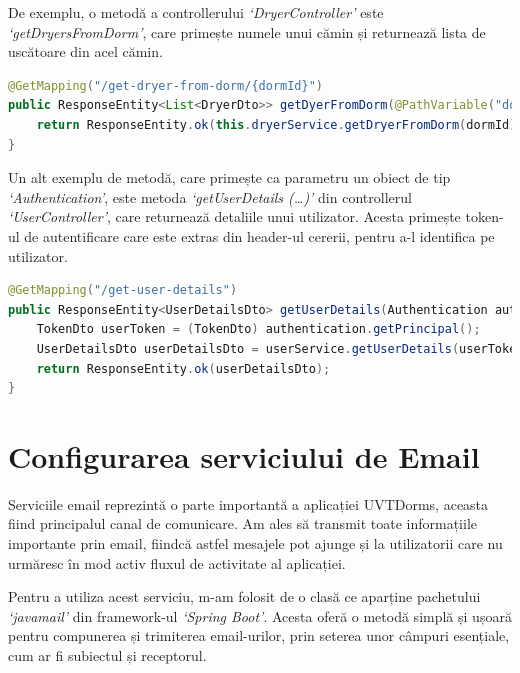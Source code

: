 \documentclass[12pt,a4paper]{report}
\theoremstyle{definition}
\theoremstyle{remark}
\begin{document}
\par De exemplu, o metodă a controllerului \textit{`DryerController'} este \textit{`getDryersFromDorm'}, care primește numele unui cămin și returnează lista de uscătoare din acel cămin.

\begin{lstlisting}[language=Java, caption={Metoda getDryersFromDorm}]
@GetMapping("/get-dryer-from-dorm/{dormId}")
public ResponseEntity<List<DryerDto>> getDyerFromDorm(@PathVariable("dormId") String dormId) {
    return ResponseEntity.ok(this.dryerService.getDryerFromDorm(dormId));
}
\end{lstlisting}

\par Un alt exemplu de metodă, care primește ca parametru un obiect de tip \textit{`Authentication'}, este metoda \textit{`getUserDetails (\ldots)'} din controllerul \textit{`UserController'}, care returnează detaliile unui utilizator. Acesta primește token-ul de autentificare care este extras din header-ul cererii, pentru a-l identifica pe utilizator.

\begin{lstlisting}[language=Java, caption={Metoda getUserDetails(...)}]
@GetMapping("/get-user-details")
public ResponseEntity<UserDetailsDto> getUserDetails(Authentication authentication) {
    TokenDto userToken = (TokenDto) authentication.getPrincipal();
    UserDetailsDto userDetailsDto = userService.getUserDetails(userToken.getEmail());
    return ResponseEntity.ok(userDetailsDto);
}
\end{lstlisting}

\section{Configurarea serviciului de Email}

\par Serviciile email reprezintă o parte importantă a aplicației UVTDorms, aceasta fiind principalul canal de comunicare. Am ales să transmit toate informațiile importante prin email, fiindcă astfel mesajele pot ajunge și la utilizatorii care nu urmăresc în mod activ fluxul de activitate al aplicației.

\par Pentru a utiliza acest serviciu, m-am folosit de o clasă ce aparține pachetului \textit{`javamail'} din framework-ul \textit{`Spring Boot'}. Acesta oferă o metodă simplă și ușoară pentru compunerea și trimiterea email-urilor, prin seterea unor câmpuri esențiale, cum ar fi subiectul și receptorul\cite{guide_to_spring_email}.
\end{document}
